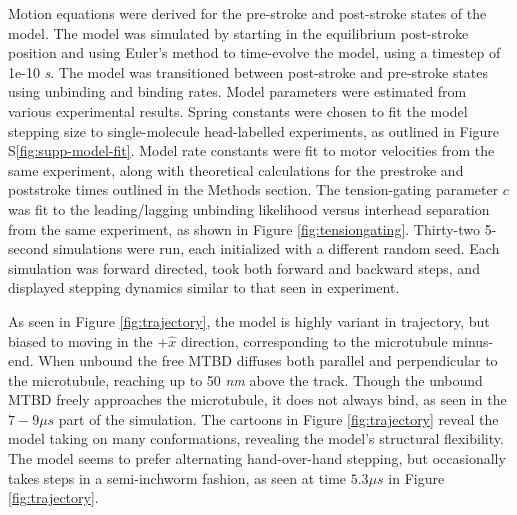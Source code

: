 \documentclass[9pt,twocolumn,twoside]{article}
\begin{document}
Motion equations were derived for the pre-stroke and post-stroke states of the model. The model was simulated by starting in the equilibrium post-stroke position and using Euler's method to time-evolve the model, using a timestep of 1e-10 \textit{s}. The model was transitioned between post-stroke and pre-stroke states using unbinding and binding rates. Model parameters were estimated from various experimental results. Spring constants were chosen to fit the model stepping size to single-molecule head-labelled experiments\cite{yildizpaper}, as outlined in Figure S\ref{fig:supp-model-fit}. Model rate constants were fit to motor velocities from the same experiment, along with theoretical calculations for the prestroke and poststroke times outlined in the Methods section. The tension-gating parameter $c$ was fit to the leading/lagging unbinding likelihood versus interhead separation from the same experiment, as shown in Figure \ref{fig:tensiongating}. Thirty-two 5-second simulations were run, each initialized with a different random seed. Each simulation was forward directed, took both forward and backward steps, and displayed stepping dynamics similar to that seen in experiment.

As seen in Figure \ref{fig:trajectory}, the model is highly variant in trajectory, but biased to moving in the $+\hat{x}$ direction, corresponding to the microtubule minus-end. When unbound the free MTBD diffuses both parallel and perpendicular to the microtubule, reaching up to 50 \textit{nm} above the track. Though the unbound MTBD freely approaches the microtubule, it does not always bind, as seen in the $7-9 \mu s$ part of the simulation. The cartoons in Figure \ref{fig:trajectory} reveal the model taking on many conformations, revealing the model's structural flexibility. The model seems to prefer alternating hand-over-hand stepping, but occasionally takes steps in a semi-inchworm fashion, as seen at time $5.3 \mu s$ in Figure \ref{fig:trajectory}.

\end{document}
